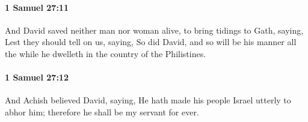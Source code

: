 		\paragraph{1 Samuel 27:11} %
			\label{1SAMUEL-27-11}

			And David saved neither man nor woman alive, to bring tidings to Gath, saying, Lest they should tell on us, saying, So did David, and so will be his manner all the while he dwelleth in the country of the Philistines.


		\paragraph{1 Samuel 27:12} %
			\label{1SAMUEL-27-12}

			And Achish believed David, saying, He hath made his people Israel utterly to abhor him; therefore he shall be my servant for ever.

